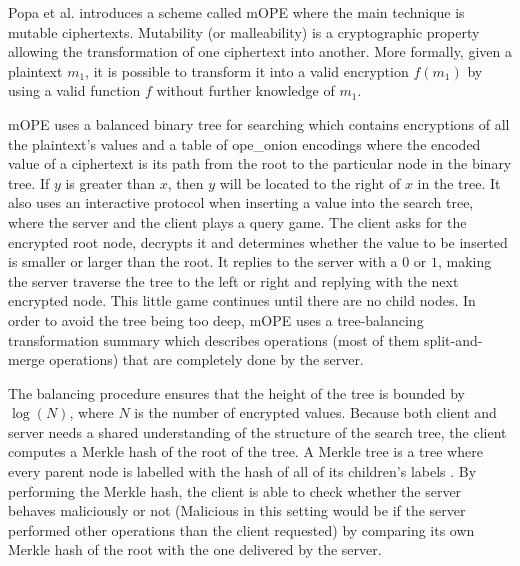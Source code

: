 
Popa et al. \cite{CryptDB_OPE_Encoding} introduces a scheme called \Gls{mOPE} where the main technique is mutable ciphertexts. Mutability (or malleability) is a cryptographic property allowing the transformation of one ciphertext into another. More formally, given a plaintext $m_1$, it is possible to transform it into a valid encryption $f(m_1)$ by using a valid function $f$ without further knowledge of $m_1$.

\Gls{mOPE} uses a balanced binary tree for searching which contains encryptions of all the plaintext's values and a table of \Gls{ope_onion} encodings where the encoded value of a ciphertext is its path from the root to the particular node in the binary tree. If $y$ is greater than $x$, then $y$ will be located to the right of $x$ in the tree. It also uses an interactive protocol when inserting a value into the search tree, where the server and the client plays a query game. The client asks for the encrypted root node, decrypts it and determines whether the value to be inserted is smaller or larger than the root. It replies to the server with a $0$ or $1$, making the server traverse the tree to the left or right and replying with the next encrypted node. This little game continues until there are no child nodes. In order to avoid the tree being too deep, \Gls{mOPE} uses a tree-balancing transformation summary which describes operations (most of them split-and-merge operations) that are completely done by the server.

The balancing procedure ensures that the height of the tree is bounded by $\log(N)$, where $N$ is the number of encrypted values. Because both client and server needs a shared understanding of the structure of the search tree, the client computes a Merkle hash of the root of the tree. A Merkle tree is a tree where every parent node is labelled with the hash of all of its children's labels \cite{Merkle}. By performing the Merkle hash, the client is able to check whether the server behaves maliciously or not (Malicious in this setting would be if the server performed other operations than the client requested) by comparing its own Merkle hash of the root with the one delivered by the server.


